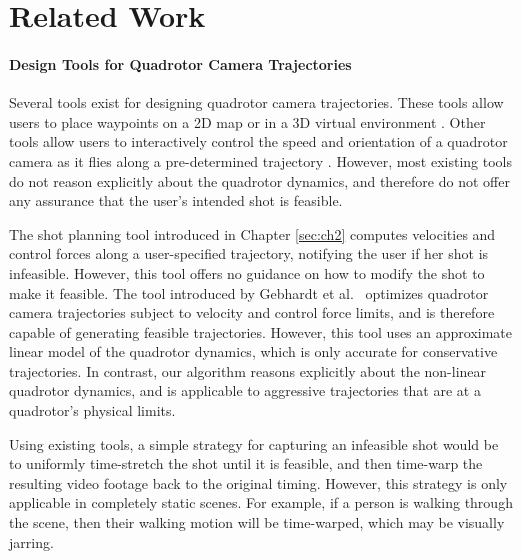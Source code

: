 \section{Related Work}

\paragraph{Design Tools for Quadrotor Camera Trajectories}

Several tools exist for designing quadrotor camera trajectories.
These tools allow users to place waypoints on a 2D map \cite{apm:2015,dji:2015} or in a 3D virtual environment \cite{gebhardt:2016,joubert:2015,meier:2012}.
Other tools allow users to interactively control the speed and orientation of a quadrotor camera as it flies along a pre-determined trajectory \cite{3drobotics:2015,dji:2015a,joubert:2015}. 
However, most existing tools do not reason explicitly about the quadrotor dynamics, and therefore do not offer any assurance that the user's intended shot is feasible.


The shot planning tool introduced in Chapter \ref{sec:ch2} computes velocities and control forces along a user-specified trajectory, notifying the user if her shot is infeasible. However, this tool offers no guidance on how to modify the shot to make it feasible.
The tool introduced by Gebhardt et al.~ optimizes quadrotor camera trajectories subject to velocity and control force limits, and is therefore capable of generating feasible trajectories.
However, this tool uses an approximate linear model of the quadrotor dynamics, which is only accurate for conservative trajectories.
In contrast, our algorithm reasons explicitly about the non-linear quadrotor dynamics, and is applicable to aggressive trajectories that are at a quadrotor's physical limits.

Using existing tools, a simple strategy for capturing an infeasible shot would be to uniformly time-stretch the shot until it is feasible, and then time-warp the resulting video footage back to the original timing.
However, this strategy is only applicable in completely static scenes.
For example, if a person is walking through the scene, then their walking motion will be time-warped, which may be visually jarring.


